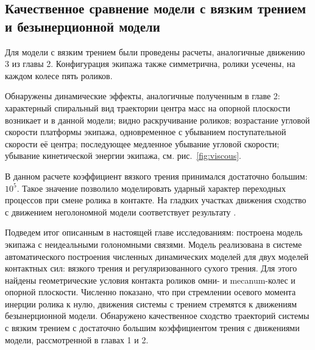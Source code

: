 \subsection{Качественное сравнение модели с вязким трением и безынерционной модели}

Для модели с вязким трением были проведены расчеты, аналогичные движению 3 из главы 2. Конфигурация экипажа также симметрична, ролики усечены, на каждом колесе пять роликов.

Обнаружены динамические эффекты, аналогичные полученным в главе 2: характерный спиральный вид траектории центра масс на опорной плоскости возникает и в данной модели; видно раскручивание роликов; возрастание угловой скорости платформы экипажа, одновременное с убыванием поступательной скорости её центра; последующее медленное убывание угловой скорости; убывание кинетической энергии экипажа, см. рис.~\ref{fig:viscous}.

В данном расчете коэффициент вязкого трения принимался достаточно большим: $10^{5}$. Такое значение позволило моделировать ударный характер переходных процессов при смене ролика в контакте. На гладких участках движения сходство с движением неголономной модели соответствует результату \cite{karapetyan1981negolonom}.

Подведем итог описанным в настоящей главе исследованиям: построена модель экипажа с неидеальными голономными связями. Модель реализована в системе автоматического построения численных динамических моделей для двух моделей контактных сил: вязкого трения и регуляризованного сухого трения. Для этого найдены геометрические условия контакта роликов омни- и mecanum-колес и опорной плоскости. Численно показано, что при стремлении осевого момента инерции ролика к нулю, движения системы с трением стремятся к движениям безынерционной модели. Обнаружено качественное сходство траекторий системы с вязким трением с достаточно большим коэффициентом трения с движениями модели, рассмотренной в главах 1 и 2.

